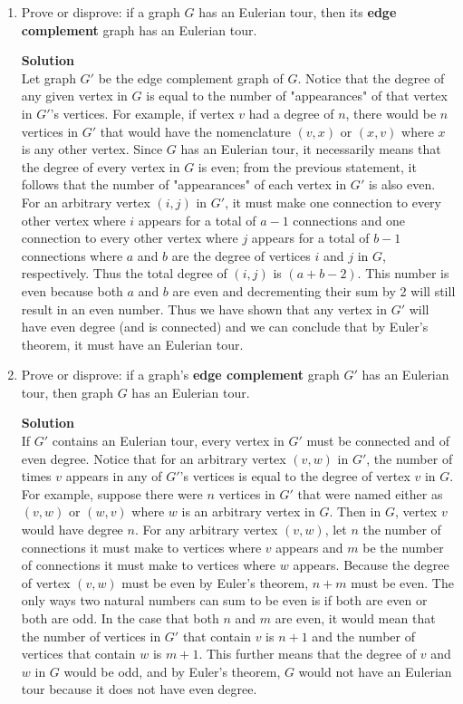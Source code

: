 \documentclass[11pt]{article}
\newenvironment{Parts}{\begin{enumerate}[label=(\alph*)]}{\end{enumerate}}
\newcommand*{\Part}{\item}
\newenvironment{Answer}{\vspace{10pt}\begin{mdframed}\textbf{Solution}\\}{\end{mdframed}\vfill\pagebreak[3]}
\newenvironment{Answer}{\vspace{10pt}}{\vfill\pagebreak[3]}
\begin{document}
\begin{Parts}
\Part  Prove or disprove: if a graph $G$ has an Eulerian tour, then its \textbf{edge complement} graph has an Eulerian tour.

\begin{Answer}

Let graph $G'$ be the edge complement graph of $G$. Notice that the degree of any given vertex in $G$ is equal to the number of "appearances" of that vertex in $G'$'s vertices. For example, if vertex $v$ had a degree of $n$, there would be $n$ vertices in $G'$ that would have the nomenclature $(v,x)$ or $(x,v)$ where $x$ is any other vertex. Since $G$ has an Eulerian tour, it necessarily means that the degree of every vertex in $G$ is even; from the previous statement, it follows that the number of "appearances" of each vertex in $G'$ is also even. For an arbitrary vertex $(i,j)$ in $G'$, it must make one connection to every other vertex where $i$ appears for a total of $a-1$ connections and one connection to every other vertex where $j$ appears for a total of $b-1$ connections where $a$ and $b$ are the degree of vertices $i$ and $j$ in $G$, respectively. Thus the total degree of $(i,j)$ is $(a+b-2)$. This number is even because both $a$ and $b$ are even and decrementing their sum by 2 will still result in an even number. Thus we have shown that any vertex in $G'$ will have even degree (and is connected) and we can conclude that by Euler's theorem, it must have an Eulerian tour.

\end{Answer}

\Part  Prove or disprove: if a graph's \textbf{edge complement} graph $G'$ has an Eulerian tour, then graph $G$ has an Eulerian tour.

\begin{Answer}

If $G'$ contains an Eulerian tour, every vertex in $G'$ must be connected and of even degree. Notice that for an arbitrary vertex $(v,w)$ in $G'$, the number of times $v$ appears in any of  $G'$'s vertices is equal to the degree of vertex $v$ in $G$. For example, suppose there were $n$ vertices in $G'$ that were named either as $(v, w)$ or $(w, v)$ where $w$ is an arbitrary vertex in $G$. Then in $G$, vertex $v$ would have degree $n$. For any arbitrary vertex $(v,w)$, let $n$ the number of connections it must make to vertices where $v$ appears and $m$ be the number of connections it must make to vertices where $w$ appears. Because the degree of vertex $(v,w)$ must be even by Euler's theorem, $n+m$ must be even. The only ways two natural numbers can sum to be even is if both are even or both are odd. In the case that both $n$ and $m$ are even, it would mean that the number of vertices in $G'$ that contain $v$ is $n+1$ and the number of vertices that contain $w$ is $m+1$. This further means that the degree of $v$ and $w$ in $G$ would be odd, and by Euler's theorem, $G$ would not have an Eulerian tour because it does not have even degree.
\end{Answer}

\end{Parts}
\end{document}
